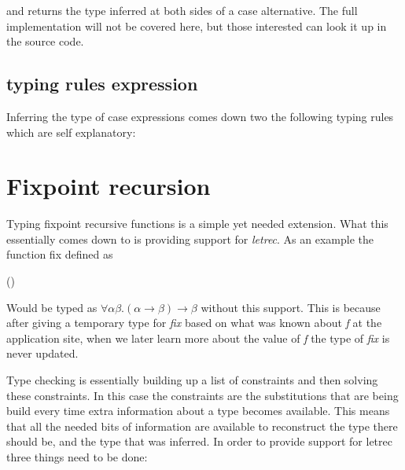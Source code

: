 \documentclass[twoside, titlepage, openright, a4paper]{book}
\newcommand{\Varid}[1]{\mathit{#1}}
\def\resethooks{%
  \global\let\SaveRestoreHook\empty
  \global\let\ColumnHook\empty}
\let\hspre\empty
\let\hspost\empty
\begin{document}
and returns the type inferred at both sides of a case alternative.
The full implementation will not be covered here, but those interested can look it up in the source code.

\subsection{typing rules expression}
Inferring the type of case expressions comes down two the following typing rules which are self explanatory:

\begin{prooftree}
\end{prooftree}

\begin{prooftree}
\end{prooftree} 
\section{Fixpoint recursion}
Typing fixpoint recursive functions is a simple yet needed extension. What this essentially comes down to is providing support for \emph{letrec}. As an example the function fix defined as

\begin{hscode}\SaveRestoreHook
\column{B}{@{}>{\hspre}l<{\hspost}@{}}%
\column{E}{@{}>{\hspre}l<{\hspost}@{}}%
\>[B]{}\Varid{fix}\;\Varid{f}\mathrel{=}\Varid{f}\;(\Varid{fix}\;\Varid{f}){}\<[E]%
\ColumnHook
\end{hscode}\resethooks

Would be typed as $\forall \alpha \beta. (\alpha \rightarrow \beta) \rightarrow \beta$ without this support. This is because after giving a temporary type for \emph{fix} based on what was known about \emph{f} at the application site, when we later learn more about the value of \emph{f} the type of \emph{fix} is never updated.

Type checking is essentially building up a list of constraints and then solving these constraints. In this case the constraints are the substitutions that are being build every time extra information about a type becomes available.
This means that all the needed bits of information are available to reconstruct the type there should be, and the type that was inferred. In order to provide support for letrec three things need to be done:
\end{document}
